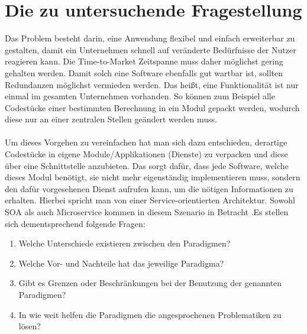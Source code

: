 \section{Die zu untersuchende Fragestellung}
\label{sec:dasProblem}
Das Problem besteht darin, eine Anwendung flexibel und einfach erweiterbar zu gestalten, damit ein Unternehmen schnell auf veränderte Bedürfnisse der Nutzer reagieren kann. Die Time-to-Market Zeitspanne muss daher möglichst gering gehalten werden. Damit solch eine Software ebenfalls gut wartbar ist, sollten Redundanzen möglichst vermieden werden. Das heißt, eine Funktionalität ist nur einmal im gesamten Unternehmen vorhanden. So können zum Beispiel alle Codestücke einer bestimmten Berechnung in ein Modul gepackt werden, wodurch diese  nur an einer zentralen Stellen geändert werden muss.
\\\\
Um dieses Vorgehen zu vereinfachen hat man sich dazu entschieden, derartige Codestücke in eigene Module/Applikationen (Dienste) zu verpacken und diese über eine Schnittstelle anzubieten. Das sorgt dafür, dass jede Software, welche dieses Modul benötigt, sie nicht mehr eigenständig implementieren muss, sondern den dafür vorgesehenen Dienst aufrufen kann, um die nötigen Informationen zu erhalten. Hierbei spricht man von einer Service-orientierten Architektur. Sowohl SOA als auch Microservice kommen in diesem Szenario in Betracht .Es stellen sich dementsprechend folgende Fragen:
\begin{enumerate}
    \item Welche Unterschiede existieren zwischen den Paradigmen?
    \item Welche Vor- und Nachteile hat das jeweilige Paradigma?
    \item Gibt es Grenzen oder Beschränkungen bei der Benutzung der genannten Paradigmen?
    \item In wie weit helfen die Paradigmen die angesprochenen Problematiken zu lösen?
\end{enumerate}
     